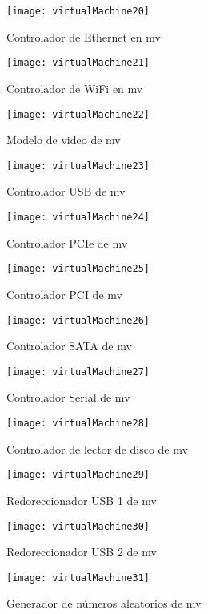 \begin{figure}[!ht]
  \caption{Controlador de Ethernet en \acrshort{mv}}
  \centering
  \texttt{[image: virtualMachine20]}
\end{figure}
\newpage
\begin{figure}[!ht]
  \caption{Controlador de WiFi en \acrshort{mv}}
  \centering
  \texttt{[image: virtualMachine21]}
\end{figure}
\begin{figure}[!ht]
  \caption{Modelo de video de \acrshort{mv}}
  \centering
  \texttt{[image: virtualMachine22]}
\end{figure}
\newpage
\begin{figure}[!ht]
  \caption{Controlador USB de \acrshort{mv}}
  \centering
  \texttt{[image: virtualMachine23]}
\end{figure}
\begin{figure}[!ht]
  \caption{Controlador PCIe de \acrshort{mv}}
  \centering
  \texttt{[image: virtualMachine24]}
\end{figure}
\newpage
\begin{figure}[!ht]
  \caption{Controlador PCI de \acrshort{mv}}
  \centering
  \texttt{[image: virtualMachine25]}
\end{figure}
\begin{figure}[!ht]
  \caption{Controlador SATA de \acrshort{mv}}
  \centering
  \texttt{[image: virtualMachine26]}
\end{figure}
\newpage
\begin{figure}[!ht]
  \caption{Controlador Serial de \acrshort{mv}}
  \centering
  \texttt{[image: virtualMachine27]}
\end{figure}
\begin{figure}[!ht]
  \caption{Controlador de lector de disco de \acrshort{mv}}
  \centering
  \texttt{[image: virtualMachine28]}
\end{figure}
\newpage
\begin{figure}[!ht]
  \caption{Redoreccionador USB 1 de \acrshort{mv}}
  \centering
  \texttt{[image: virtualMachine29]}
\end{figure}
\begin{figure}[!ht]
  \caption{Redoreccionador USB 2 de \acrshort{mv}}
  \centering
  \texttt{[image: virtualMachine30]}
\end{figure}
\newpage
\begin{figure}[!ht]
  \caption{Generador de números aleatorios de \acrshort{mv}}
  \centering
  \texttt{[image: virtualMachine31]}
\end{figure}
